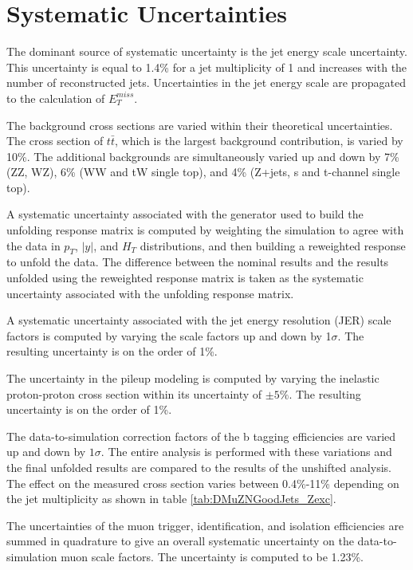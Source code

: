 \documentclass[oneside, letterpaper, oldfontcommands]{memoir}
\begin{document}
\section{Systematic Uncertainties}

\qquad The dominant source of systematic uncertainty is the jet energy scale uncertainty. This uncertainty is equal to 1.4\% for a jet multiplicity of 1 and increases with the number of reconstructed jets. Uncertainties in the jet energy scale are propagated to the calculation of $E_{T}^{miss}$.

\qquad The background cross sections are varied within their theoretical uncertainties. The cross section of $t\bar{t}$, which is the largest background contribution, is varied by 10\%. The additional backgrounds are simultaneously varied up and down by 7\% (ZZ, WZ), 6\% (WW and tW single top), and 4\% (Z+jets, s and t-channel single top). 

\qquad A systematic uncertainty associated with the generator used to build the unfolding response matrix is computed by weighting the simulation to agree with the data in $p_{T}$, $|y|$, and $H_{T}$ distributions, and then building a reweighted response to unfold the data. The difference between the nominal results and the results unfolded using the reweighted response matrix is taken as the systematic uncertainty associated with the unfolding response matrix.

\qquad A systematic uncertainty associated with the jet energy resolution (JER) scale factors is computed by varying the scale factors up and down by 1$\sigma$. The resulting uncertainty is on the order of 1\%.

\qquad The uncertainty in the pileup modeling is computed by varying the inelastic proton-proton cross section within its uncertainty of $\pm 5\%$. The resulting uncertainty is on the order of 1\%.

\qquad The data-to-simulation correction factors of the b tagging efficiencies are varied up and down by $1 \sigma$. The entire analysis is performed with these variations and the final unfolded results are compared to the results of the unshifted analysis. The effect on the measured cross section varies between 0.4\%-11\% depending on the jet multiplicity as shown in table \ref{tab:DMuZNGoodJets_Zexc}.

\qquad The uncertainties of the muon trigger, identification, and isolation efficiencies are summed in quadrature to give an overall systematic uncertainty on the data-to-simulation muon scale factors. The uncertainty is computed to be 1.23\%.
\end{document}
